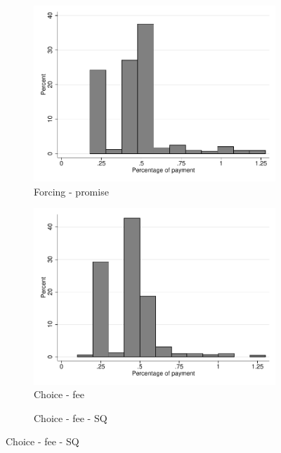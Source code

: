 \documentclass[11pt]{article}
\begin{document}
\begin{figure}[H]
\begin{center}
\begin{subfigure}{.31\textwidth}
    \caption{Forcing - promise}
        \centering
        \includegraphics[width=\textwidth]{Figuras/hist_porc_pay_cond_pro_3.pdf}
    \end{subfigure}  
     \begin{subfigure}{.31\textwidth}
    \caption{Choice - fee}
        \centering
        \includegraphics[width=\textwidth]{Figuras/hist_porc_pay_cond_pro_4.pdf}
    \end{subfigure}  
     \begin{subfigure}{.31\textwidth}
    \caption{Choice - fee - SQ}
        \centering

\end{subfigure}
\end{center}
\end{figure}
\end{document}
